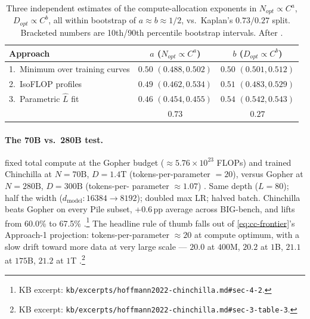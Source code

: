 \begin{table}[h]
\centering
\small
\begin{tabular}{lcc}
\toprule
Approach & $a$ ($N_{opt} \propto C^{a}$) & $b$ ($D_{opt} \propto C^{b}$) \\
\midrule
1.\ Minimum over training curves & $0.50$ \tiny{$(0.488, 0.502)$} & $0.50$ \tiny{$(0.501, 0.512)$} \\
2.\ IsoFLOP profiles             & $0.49$ \tiny{$(0.462, 0.534)$} & $0.51$ \tiny{$(0.483, 0.529)$} \\
3.\ Parametric $\hat{L}$ fit      & $0.46$ \tiny{$(0.454, 0.455)$} & $0.54$ \tiny{$(0.542, 0.543)$} \\
\midrule
\textbf{\citet{kaplan2020}}      & $\mathbf{0.73}$ & $\mathbf{0.27}$ \\
\bottomrule
\end{tabular}
\caption{Three independent estimates of the compute-allocation
exponents in $N_{opt} \propto C^{a}$, $D_{opt} \propto C^{b}$, all
within bootstrap of $a \approx b \approx 1/2$, vs.\ Kaplan's
$0.73/0.27$ split. Bracketed numbers are 10th/90th percentile
bootstrap intervals. After
\citet[\S 3, Table 2]{hoffmann2022-chinchilla}.}
\label{tab:cc-table-2}
\end{table}

\paragraph{The 70B vs.\ 280B test.}
\citet{hoffmann2022-chinchilla} fixed total compute at the Gopher
budget ($\approx 5.76 \times 10^{23}$ FLOPs) and trained Chinchilla at
$N = 70\text{B}$, $D = 1.4\text{T}$ (tokens-per-parameter $= 20$),
versus Gopher at $N = 280\text{B}$, $D = 300\text{B}$ (tokens-per-
parameter $\approx 1.07$) \citep[\S 4.1, Table 4]{hoffmann2022-chinchilla}.
Same depth ($L = 80$); half the width ($d_{\text{model}}: 16384 \to
8192$); doubled max LR; halved batch. Chinchilla beats Gopher on
every Pile subset, +0.6\,pp average across BIG-bench, and lifts 
from 60.0\% to 67.5\% \citep[\S 4.2]{hoffmann2022-chinchilla}.\footnote{KB
excerpt: \texttt{kb/excerpts/hoffmann2022-chinchilla.md\#sec-4-2}.}
The headline rule of thumb falls out of \cref{eq:cc-frontier}'s Approach-1
projection: tokens-per-parameter $\approx 20$ at compute optimum, with
a slow drift toward more data at very large scale --- $20.0$ at $400$M,
$20.2$ at $1$B, $21.1$ at $175$B, $21.2$ at $1$T \citep[\S 3, Table
3]{hoffmann2022-chinchilla}.\footnote{KB excerpt:
\texttt{kb/excerpts/hoffmann2022-chinchilla.md\#sec-3-table-3}.}

